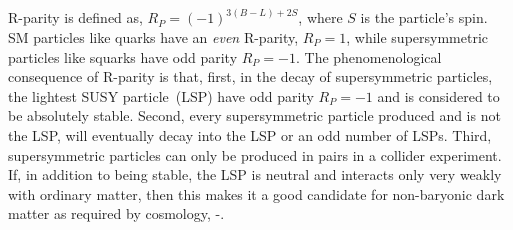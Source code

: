 {R-parity is defined as, $R_{P} = \left(-1\right)^{3(B-L) + 2S}$, where $S$ is the particle's spin.
SM particles like quarks have an \textit{even} R-parity, $R_{P} = 1$, while supersymmetric particles like squarks have odd parity $R_{P} = -1$.
The phenomenological consequence of R-parity is that, first, in the decay of supersymmetric particles, the lightest SUSY particle~(LSP) have odd parity $R_{P} =-1$ and is considered to be absolutely stable. Second, every supersymmetric particle produced and is not the LSP, will eventually decay into the LSP or an odd number of LSPs. Third, supersymmetric particles can only be produced in pairs in a collider experiment.
If, in addition to being stable, the LSP is neutral and interacts only very weakly with ordinary matter, then this makes it a good candidate for non-baryonic dark matter as required by cosmology, \cite{SUSYDM}-\cite{KOlive}.

}
